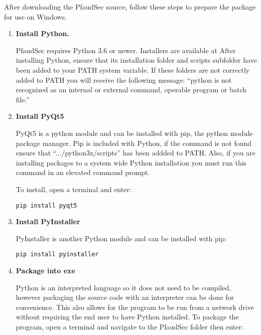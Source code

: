 \documentclass[14pt]{article}
\newcommand{\chref}[3][black]{\href{#2}{\color{#1}{#3}}}%
\begin{document}
\begin{flushleft}
After downloading the PfaudSec source, follow these steps to prepare the package for use on Windows.

\begin{enumerate}

\item \textbf{Install Python.}

PfaudSec requires Python 3.6 or newer.
Installers are available at
\chref[pfblue]{https://www.python.org/downloads/}{https://www.python.org/downloads/}
After installing Python, ensure that its installation folder and scripts subfolder have been added to your PATH system variable.
If these folders are not correctly added to PATH you will receive the following message: 
``python is not recognized as an internal or external command, operable program or batch file.''

\item \textbf{Install PyQt5}

PyQt5 is a python module and can be installed with pip, the python module package manager.
Pip is included with Python, if the command is not found ensure that ``.../python3x/scripts'' has been addded to PATH.
Also, if you are installing packages to a system wide Python installation you must run this command in an elevated command prompt.

To install, open a terminal and enter:

\begin{tcolorbox}[
boxrule=0.5pt,
colback=backgrey,
colframe=bordergrey,
sharpish corners] 
\begin{verbatim}
pip install pyqt5
\end{verbatim}
\end{tcolorbox}
\item \textbf{Install PyInstaller}

PyInstaller is another Python module and can be installed with pip:

\begin{tcolorbox}[
boxrule=0.5pt,
colback=backgrey,
colframe=bordergrey,
sharpish corners] 
\begin{verbatim}
pip install pyinstaller
\end{verbatim}
\end{tcolorbox}

\item \textbf{Package into exe}

Python is an interpreted language so it does not need to be compiled, however packaging the source code with an interpreter can be done for convenience.
This also allows for the program to be run from a network drive without requiring the end user to have Python installed.
To package the program, open a terminal and navigate to the PfaudSec folder then enter:


\end{enumerate}
\end{flushleft}
\end{document}

